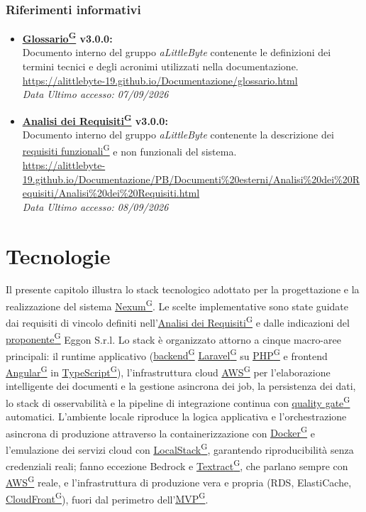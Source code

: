 \documentclass[a4paper,12pt]{article}
\providecommand{\glslink}[2]{\href{https://alittlebyte-19.github.io/Documentazione/glossario.html\#gls-#1}{\underline{#2}\textsuperscript{\scriptsize G}}}
\begin{document}
\subsubsection{Riferimenti informativi}
\begin{itemize}
    \item \textbf{\glslink{glossario}{Glossario} v3.0.0:}\\
    Documento interno del gruppo \textit{aLittleByte} contenente le definizioni dei termini tecnici e degli acronimi utilizzati nella documentazione.\\
    \url{https://alittlebyte-19.github.io/Documentazione/glossario.html}\\
    \textit{Data Ultimo accesso: 07/09/2026}

    \item \textbf{\glslink{analisi-dei-requisiti-adr}{Analisi dei Requisiti} v3.0.0:}\\
    Documento interno del gruppo \textit{aLittleByte} contenente la descrizione dei \glslink{requisiti-funzionali}{requisiti funzionali} e non funzionali del sistema.\\
    \url{https://alittlebyte-19.github.io/Documentazione/PB/Documenti\%20esterni/Analisi\%20dei\%20Requisiti/Analisi\%20dei\%20Requisiti.html}\\
    \textit{Data Ultimo accesso: 08/09/2026}

\end{itemize}

\section{Tecnologie}

Il presente capitolo illustra lo stack tecnologico adottato per la progettazione e la realizzazione del sistema \glslink{nexum}{Nexum}. Le scelte implementative sono state guidate dai requisiti di vincolo definiti nell'\glslink{analisi-dei-requisiti-adr}{Analisi dei Requisiti} e dalle indicazioni del \glslink{committente-proponente}{proponente} Eggon S.r.l. Lo stack è organizzato attorno a cinque macro-aree principali: il runtime applicativo (\glslink{backend}{backend} \glslink{laravel}{Laravel} su \glslink{php}{PHP} e frontend \glslink{angular}{Angular} in \glslink{typescript}{TypeScript}), l'infrastruttura cloud \glslink{aws}{AWS} per l'elaborazione intelligente dei documenti e la gestione asincrona dei job, la persistenza dei dati, lo stack di osservabilità e la pipeline di integrazione continua con \glslink{quality-gate}{quality gate} automatici. L'ambiente locale riproduce la logica applicativa e l'orchestrazione asincrona di produzione attraverso la containerizzazione con \glslink{docker}{Docker} e l'emulazione dei servizi cloud con \glslink{localstack}{LocalStack}, garantendo riproducibilità senza credenziali reali; fanno eccezione Bedrock e \glslink{textract}{Textract}, che parlano sempre con \glslink{aws}{AWS} reale, e l'infrastruttura di produzione vera e propria (RDS, ElastiCache, \glslink{cloudfront}{CloudFront}), fuori dal perimetro dell'\glslink{mvp-minimum-viable-product}{MVP}.
\end{document}

